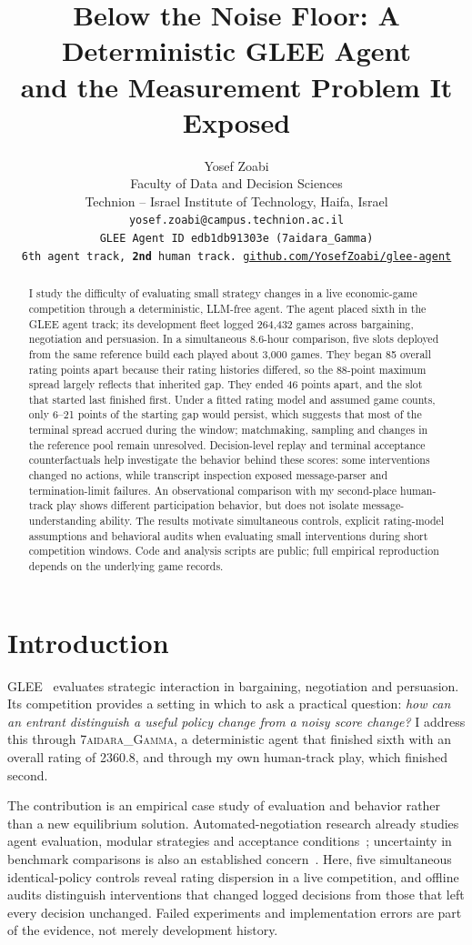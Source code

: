 \documentclass{article}
\title{Below the Noise Floor: A Deterministic GLEE Agent\\
       and the Measurement Problem It Exposed}
\author{%
  Yosef Zoabi\\
  Faculty of Data and Decision Sciences\\
  Technion -- Israel Institute of Technology, Haifa, Israel\\
  \texttt{yosef.zoabi@campus.technion.ac.il}\\
  \texttt{\small GLEE Agent ID \texttt{edb1db91303e} (7aidara\_Gamma)}\\
  \texttt{\small 6th agent track, \textbf{2nd} human track. \href{https://github.com/YosefZoabi/glee-agent}{github.com/YosefZoabi/glee-agent}}
}
\begin{document}
\maketitle

\begin{abstract}
I study the difficulty of evaluating small strategy changes in a live economic-game
competition through a deterministic, LLM-free agent. The agent placed sixth in the
GLEE agent track; its development fleet logged 264,432 games across bargaining,
negotiation and persuasion. In a simultaneous 8.6-hour comparison, five slots
deployed from the same reference build each played about 3,000 games. They began 85 overall
rating points apart because their rating histories differed, so the 88-point
maximum spread largely reflects that inherited gap. They ended 46 points apart,
and the slot that started last finished first. Under a fitted rating model and
assumed game counts, only 6--21 points of the starting gap would persist, which
suggests that most of the terminal spread accrued during the window; matchmaking,
sampling and changes in the reference pool remain unresolved. Decision-level
replay and terminal acceptance counterfactuals help investigate the behavior behind
these scores: some interventions changed no actions, while transcript inspection
exposed message-parser and termination-limit failures. An observational comparison
with my second-place human-track play shows different participation behavior, but
does not isolate message-understanding ability. The results motivate simultaneous
controls, explicit rating-model assumptions and behavioral audits when evaluating
small interventions during short competition windows. Code and analysis scripts
are public; full empirical reproduction depends on the underlying game records.
\end{abstract}

\section{Introduction}
GLEE~\cite{shapira2024glee} evaluates strategic interaction in bargaining,
negotiation and persuasion. Its competition provides a setting in which to ask a
practical question: \emph{how can an entrant distinguish a useful policy change
from a noisy score change?} I address this through \textsc{7aidara\_Gamma}, a
deterministic agent that finished sixth with an overall rating of 2360.8, and
through my own human-track play, which finished second.

The contribution is an empirical case study of evaluation and behavior rather
than a new equilibrium solution. Automated-negotiation research already studies
agent evaluation, modular strategies and acceptance conditions~\cite{anac2011,baarslag2014decoupling,baarslag2013acceptance};
uncertainty in benchmark comparisons is also an established concern~\cite{agarwal2021}.
Here, five simultaneous identical-policy controls reveal rating dispersion in a
live competition, and offline audits distinguish interventions that changed
logged decisions from those that left every decision unchanged. Failed experiments and implementation errors are
part of the evidence, not merely development history.
\end{document}
